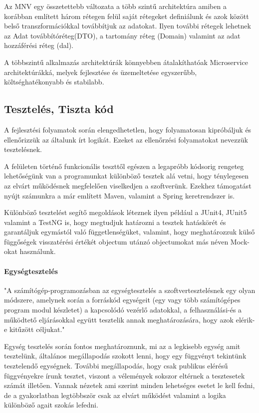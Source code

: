 Az MNV egy összetettebb változata  a több szintű architektúra amiben a korábban említett három rétegen felül saját rétegeket definiálunk és azok között belső transzformációkkal továbbítjuk az adatokat. Ilyen további rétegek lehetnek az Adat továbbítóréteg(DTO), a tartomány réteg (Domain) valamint az adat hozzáférési réteg (dal).

\vskip 0.2in
A többszintű alkalmazás architektúrák könnyebben átalakíthatóak Microservice architektúrákká, melyek fejlesztése és üzemeltetése egyszerűbb, költséghatékonyabb és stabilabb. 

\subsection{Tesztelés, Tiszta kód}

A fejlesztési folyamatok során elengedhetetlen, hogy folyamatosan kipróbáljuk és ellenőrizzük az általunk írt logikát. Ezeket az ellenőrzési folyamatokat nevezzük tesztelésnek.

A felületen történő funkcionális teszttől egészen a legapróbb kódsorig rengeteg lehetőségünk van a programunkat különböző tesztek alá vetni, hogy ténylegesen az elvárt működésnek megfelelően viselkedjen a szoftverünk.
Ezekhez támogatást nyújt számunkra a már említett Maven, valamint a Spring keretrendszer is. 

Különböző tesztelést segítő megoldások léteznek ilyen például a JUnit4, JUnit5 valamint a TestNG is, hogy  megtudjuk határozni a tesztek hatáskörét és garantáljuk egymástól való függetlenségüket, valamint, hogy meghatározzuk külső függőségek visszatérési értékét objectum utánzó objectumokat más néven Mock-okat használunk.

\paragraph{Egységtesztelés} "A számítógép-programozásban az egységtesztelés a szoftvertesztelésnek egy olyan módszere, amelynek során a forráskód egységeit (egy vagy több számítógépes program modul készletet) a kapcsolódó vezérlő adatokkal, a felhasználási-és a működtető eljárásokkal együtt tesztelik annak meghatározására, hogy azok elérik-e kitűzött céljukat."\cite{unittest}

Egység tesztelés során fontos meghatároznunk, mi az a legkisebb egység amit tesztelünk, általános megállapodás szokott lenni, hogy egy függvényt tekintünk tesztelendő egységnek. További megállapodás, hogy csak publikus elérésű függvényekre írunk tesztet, viszont a vélemények sokszor eltérnek a tesztesetek számát illetően. Vannak nézetek ami szerint minden lehetséges esetet le kell fedni, de a gyakorlatban legtöbbször csak az elvárt működést valamint a logika különböző agait szokás lefedni.

